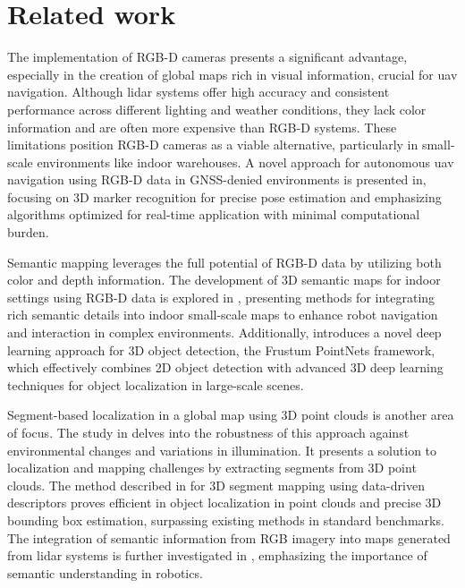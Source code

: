 \chapter{Related work}

The implementation of RGB-D cameras presents a significant advantage, especially in the creation of global maps rich in visual information, crucial for \acrshort{uav} navigation. Although \acrshort{lidar} systems offer high accuracy and consistent performance across different lighting and weather conditions\cite{segmap}, they lack color information and are often more expensive than RGB-D systems. These limitations position RGB-D cameras as a viable alternative, particularly in small-scale environments like indoor warehouses. A novel approach for autonomous \acrshort{uav} navigation using RGB-D data in GNSS-denied environments is presented in\cite{7152290}, focusing on 3D marker recognition for precise pose estimation and emphasizing algorithms optimized for real-time application with minimal computational burden. 

Semantic mapping leverages the full potential of RGB-D data by utilizing both color and depth information. The development of 3D semantic maps for indoor settings using RGB-D data is explored in \cite{Zhao2016Building3S}, presenting methods for integrating rich semantic details into indoor small-scale maps to enhance robot navigation and interaction in complex environments. Additionally, \cite{qi2018frustum} introduces a novel deep learning approach for 3D object detection, the Frustum PointNets framework, which effectively combines 2D object detection with advanced 3D deep learning techniques for object localization in large-scale scenes.

Segment-based localization in a global map using 3D point clouds is another area of focus. The study in \cite{segmatch2017} delves into the robustness of this approach against environmental changes and variations in illumination. It presents a solution to localization and mapping challenges by extracting segments from 3D point clouds. The method described in \cite{segmap} for 3D segment mapping using data-driven descriptors proves efficient in object localization in point clouds and precise 3D bounding box estimation, surpassing existing methods in standard benchmarks. The integration of semantic information from RGB imagery into maps generated from \acrshort{lidar} systems is further investigated in \cite{cramariuc2021semsegmap}, emphasizing the importance of semantic understanding in robotics. 



